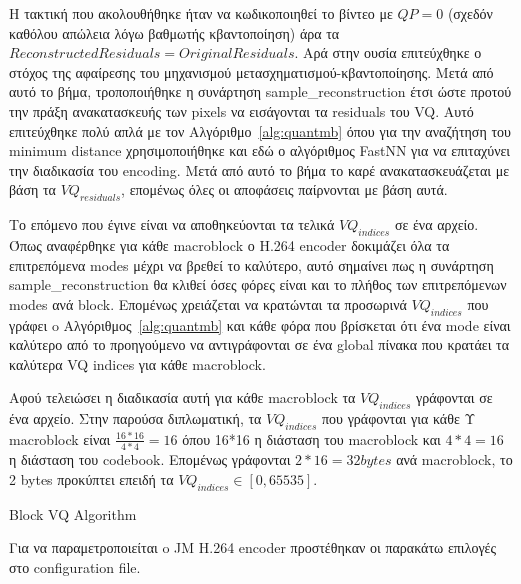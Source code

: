 \indent Η τακτική που ακολουθήθηκε ήταν να κωδικοποιηθεί το βίντεο με $QP=0$ (σχεδόν καθόλου απώλεια λόγω βαθμωτής κβαντοποίηση) άρα τα $Reconstructed Residuals = Original Residuals$. Αρά στην ουσία επιτεύχθηκε ο στόχος της αφαίρεσης του μηχανισμού μετασχηματισμού-κβαντοποίησης. Μετά από αυτό το βήμα, τροποποιήθηκε η συνάρτηση sample\_reconstruction έτσι ώστε προτού την πράξη ανακατασκευής των pixels να εισάγονται τα residuals του VQ. Αυτό επιτεύχθηκε πολύ απλά με τον Αλγόριθμο~\ref{alg:quantmb} όπου για την αναζήτηση του minimum distance χρησιμοποιήθηκε και εδώ ο αλγόριθμος FastNN για να επιταχύνει την διαδικασία του encoding. Μετά από αυτό το βήμα το καρέ ανακατασκευάζεται με βάση τα $VQ_{residuals}$, επομένως όλες οι αποφάσεις παίρνονται με βάση αυτά.

\indent Το επόμενο που έγινε είναι να αποθηκεύονται τα τελικά $VQ_{indices}$ σε ένα αρχείο. Όπως αναφέρθηκε για κάθε macroblock ο H.264 encoder δοκιμάζει όλα τα επιτρεπόμενα modes μέχρι να βρεθεί το καλύτερο, αυτό σημαίνει πως η συνάρτηση sample\_reconstruction θα κλιθεί όσες φόρες είναι και το πλήθος των επιτρεπόμενων modes ανά block. Επομένως χρειάζεται να κρατώνται τα προσωρινά $VQ_{indices}$ που γράφει o Αλγόριθμος~\ref{alg:quantmb} και κάθε φόρα που βρίσκεται ότι ένα mode είναι καλύτερο από το προηγούμενο να αντιγράφονται σε ένα global πίνακα που κρατάει τα καλύτερα VQ indices για κάθε macroblock.

\indent Αφού τελειώσει η διαδικασία αυτή για κάθε macroblock  τα $VQ_{indices}$ γράφονται σε ένα αρχείο. Στην παρούσα διπλωματική, τα $VQ_{indices}$ που γράφονται για κάθε Υ macroblock είναι $\frac{16*16}{4*4}=16$ όπου 16*16 η διάσταση του macroblock και $4*4=16$ η διάσταση του codebook. Επομένως γράφονται $2*16 = 32bytes$ ανά macroblock, το 2 bytes προκύπτει επειδή τα $VQ_{indices}\in[0,65535]$.

\begin{algorithm}[h]
\begin{algorithmic}[1]
\EndFor
\EndFunction
\end{algorithmic}
\caption{Block VQ Algorithm}
\label{alg:quantmb}
\end{algorithm}

\indent Για να παραμετροποιείται o JM Η.264 encoder προστέθηκαν οι παρακάτω επιλογές στο configuration file.


